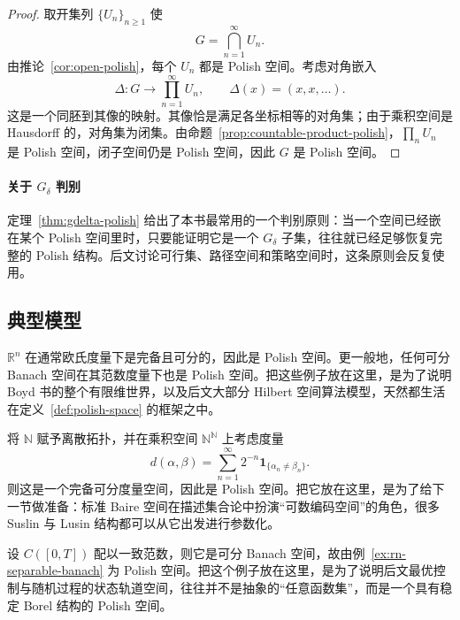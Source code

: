 \begin{proof}
取开集列 $\{U_n\}_{n\ge1}$ 使
\[
G=\bigcap_{n=1}^{\infty}U_n.
\]
由推论~\ref{cor:open-polish}，每个 $U_n$ 都是 Polish 空间。考虑对角嵌入
\[
\Delta\colon G\to \prod_{n=1}^{\infty}U_n,\qquad \Delta(x)=(x,x,\dots).
\]
这是一个同胚到其像的映射。其像恰是满足各坐标相等的对角集；由于乘积空间是 Hausdorff 的，对角集为闭集。由命题~\ref{prop:countable-product-polish}，$\prod_n U_n$ 是 Polish 空间，闭子空间仍是 Polish 空间，因此 $G$ 是 Polish 空间。
\end{proof}

\paragraph{关于 $G_\delta$ 判别}

\begin{remark}
定理~\ref{thm:gdelta-polish} 给出了本书最常用的一个判别原则：当一个空间已经嵌在某个 Polish 空间里时，只要能证明它是一个 $G_\delta$ 子集，往往就已经足够恢复完整的 Polish 结构。后文讨论可行集、路径空间和策略空间时，这条原则会反复使用。
\end{remark}

\subsection{典型模型}

\begin{example}\label{ex:rn-separable-banach}
$\mathbb R^n$ 在通常欧氏度量下是完备且可分的，因此是 Polish 空间。更一般地，任何可分 Banach 空间在其范数度量下也是 Polish 空间。把这些例子放在这里，是为了说明 Boyd 书的整个有限维世界，以及后文大部分 Hilbert 空间算法模型，天然都生活在定义~\ref{def:polish-space} 的框架之中。
\end{example}

\begin{example}\label{ex:baire-space}
将 $\mathbb N$ 赋予离散拓扑，并在乘积空间 $\mathbb N^{\mathbb N}$ 上考虑度量
\[
d(\alpha,\beta)=\sum_{n=1}^{\infty}2^{-n}\mathbf 1_{\{\alpha_n\neq \beta_n\}}.
\]
则这是一个完备可分度量空间，因此是 Polish 空间。把它放在这里，是为了给下一节做准备：标准 Baire 空间在描述集合论中扮演“可数编码空间”的角色，很多 Suslin 与 Lusin 结构都可以从它出发进行参数化。
\end{example}

\begin{example}\label{ex:path-space-polish}
设 $C([0,T])$ 配以一致范数，则它是可分 Banach 空间，故由例~\ref{ex:rn-separable-banach} 为 Polish 空间。把这个例子放在这里，是为了说明后文最优控制与随机过程的状态轨道空间，往往并不是抽象的“任意函数集”，而是一个具有稳定 Borel 结构的 Polish 空间。
\end{example}

